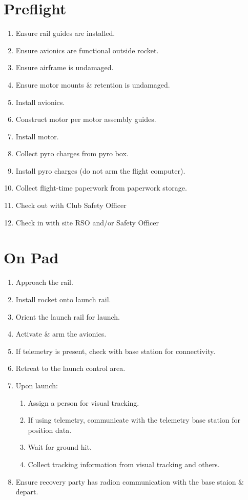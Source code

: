 \documentclass[12pt]{article}
\begin{document}
\section{Preflight}
\begin{addmargin}[3em]{3em}
	\begin{enumerate}[label=\thesection.\arabic*\quad$\square$]
		\item Ensure rail guides are installed.
		\item Ensure avionics are functional outside rocket. 
		\item Ensure airframe is undamaged.
		\item Ensure motor mounts \& retention is undamaged.
		\item Install avionics.
		\item Construct motor per motor assembly guides.
		\item Install motor.
		\item Collect pyro charges from pyro box.
		\item Install pyro charges (do not arm the flight computer).
		\item Collect flight-time paperwork from paperwork storage.
		\item Check out with Club Safety Officer
		\item Check in with site RSO and/or Safety Officer
	\end{enumerate}
\end{addmargin}
\section{On Pad}
\begin{addmargin}[3em]{3em}
	\begin{enumerate}[label=\thesection.\arabic*\quad$\square$]
		\item Approach the rail.
		\item Install rocket onto launch rail.
		\item Orient the launch rail for launch.
		\item Activate \& arm the avionics.
		\item If telemetry is present, check with base station for connectivity.
		\item Retreat to the launch control area.
		\item Upon launch:
		\begin{enumerate} [label=\thesection.\arabic{enumi}.\arabic*\quad$\square$]
			\item Assign a person for visual tracking.
			\item If using telemetry, communicate with the telemetry base station for position data.
			\item Wait for ground hit.
			\item Collect tracking information from visual tracking and others.
		\end{enumerate}
		\item Ensure recovery party has radion communication with the base staion \& depart. 
	\end{enumerate}
\end{addmargin}
\end{document}
